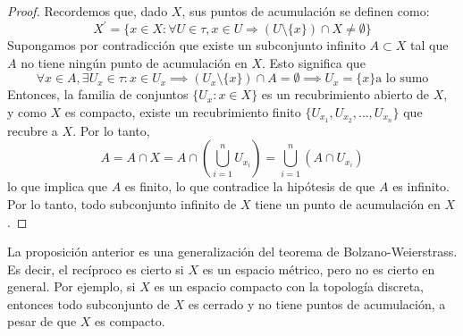 \begin{proof}
    Recordemos que, dado $X$, sus puntos de acumulación se definen como: 
    $$X^{\prime} = \{x \in X : \forall U \in \tau, x \in U \Rightarrow (U \setminus \{x\}) \cap X \neq \emptyset\}$$
    Supongamos por contradicción que existe un subconjunto infinito $A \subset X$ tal que $A$ no tiene ningún punto de acumulación en $X$. Esto significa que 
    $$\forall x \in A, \exists U_x \in \tau : x \in U_x \implies (U_x \setminus \{x\}) \cap A = \emptyset \implies U_x = \{x\} \text{a lo sumo}$$
    Entonces, la familia de conjuntos $\{U_x : x \in X\}$ es un recubrimiento abierto de $X$, y como $X$ es compacto, existe un recubrimiento finito $\{U_{x_1}, U_{x_2}, \ldots, U_{x_n}\}$ que recubre a $X$. Por lo tanto, 
    $$A = A \cap X = A \cap \left(\bigcup_{i = 1}^{n} U_{x_i}\right) = \bigcup_{i = 1}^{n} (A \cap U_{x_i})$$
    lo que implica que $A$ es finito, lo que contradice la hipótesis de que $A$ es infinito. Por lo tanto, todo subconjunto infinito de $X$ tiene un punto de acumulación en $X$.
\end{proof}
\begin{observación}
    La proposición anterior es una generalización del teorema de Bolzano-Weierstrass. Es decir, el recíproco es cierto si $X$ es un espacio métrico, pero no es cierto en general. Por ejemplo, si $X$ es un espacio compacto con la topología discreta, entonces todo subconjunto de $X$ es cerrado y no tiene puntos de acumulación, a pesar de que $X$ es compacto.
\end{observación}
